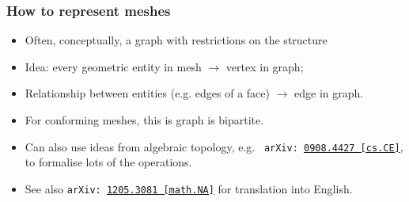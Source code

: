 \documentclass[presentation,aspectratio=43, 10pt]{beamer}
\newcommand{\arxivlink}[2]{{\texttt{arXiv:\,\href{https://arxiv.org/abs/#1}{#1\,[#2]}}}}
\begin{document}
\begin{frame}
  \frametitle{How to represent meshes}
  \begin{itemize}
  \item Often, conceptually, a graph with restrictions on the
    structure
  \item Idea: every geometric entity in mesh $\rightarrow$ vertex in
    graph;
  \item Relationship between entities (e.g. edges of a face)
    $\rightarrow$ edge in graph.
  \item For conforming meshes, this is graph is bipartite.
  \item Can also use ideas from algebraic topology, e.g.~\textcite{Knepley:2009}
    \arxivlink{0908.4427}{cs.CE}, to formalise lots of the
    operations.
  \item See also \textcite{Logg:2009} \arxivlink{1205.3081}{math.NA}
    for translation into English.
  \end{itemize}
\end{frame}
\end{document}
